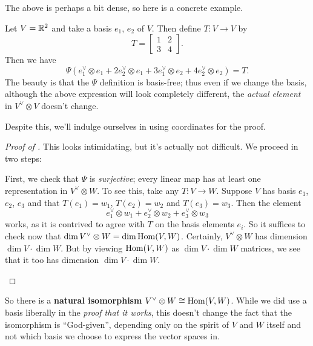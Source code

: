 The above is perhaps a bit dense, so here is a concrete example.
\begin{example}
	Let $V = \mathbb R^2$ and take a basis $e_1$, $e_2$ of $V$.
	Then define $T \colon V \to V$ by
	\[ T = \begin{bmatrix}
			1 & 2 \\ 3 & 4
		\end{bmatrix}. \]
	Then we have
	\[ \Psi(e_1^\vee \otimes e_1 + 2e_2^\vee \otimes e_1
		+ 3e_1^\vee \otimes e_2 + 4e_2^\vee \otimes e_2) = T. \]
	The beauty is that the $\Psi$ definition is basis-free;
	thus even if we change the basis,
	although the above expression will look completely different,
	the \emph{actual element} in $V^\vee \otimes V$ doesn't change.
\end{example}

Despite this, we'll indulge ourselves in using coordinates for the proof.
\begin{proof}
	[Proof of ]
	This looks intimidating, but it's actually not difficult.
	We proceed in two steps:
	\begin{enumerate}
		\ii First, we check that $\Psi$ is \emph{surjective};
		every linear map has at least one representation in $V^\vee \otimes W$.
		To see this, take any $T \colon V \to W$.
		Suppose $V$ has basis $e_1$, $e_2$, $e_3$ and that
		$T(e_1) = w_1$, $T(e_2) = w_2$ and $T(e_3) = w_3$.
		Then the element
		\[ e_1^\vee \otimes w_1 + e_2^\vee \otimes w_2 + e_3^\vee \otimes w_3 \]
		works, as it is contrived to agree with $T$ on the basis elements $e_i$.
		\ii So it suffices to check now that $\dim V^\vee \otimes W = \dim \operatorname{Hom}(V,W)$.
		Certainly, $V^\vee \otimes W$ has dimension $\dim V \cdot \dim W$.
		But by viewing $\operatorname{Hom}(V,W)$ as $\dim V \cdot \dim W$ matrices, we see that
		it too has dimension $\dim V \cdot \dim W$. \qedhere
	\end{enumerate}
\end{proof}
So there is a \textbf{natural isomorphism} $V^\vee \otimes W \cong \operatorname{Hom}(V,W)$.
While we did use a basis liberally in the
\emph{proof that it works}, this doesn't change the
fact that the isomorphism is ``God-given'',
depending only on the spirit of $V$ and $W$ itself
and not which basis we choose to express the vector spaces in.


